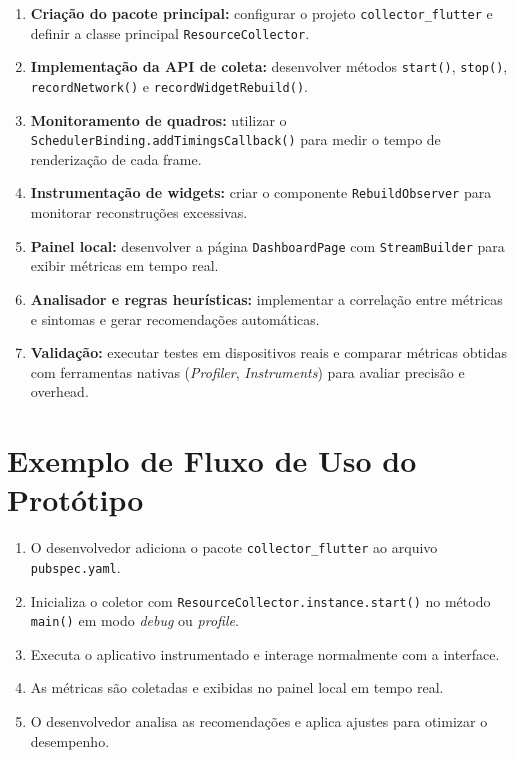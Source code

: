 \documentclass[12pt,a4paper,oneside]{abntex2}
\begin{document}
\begin{enumerate}
  \item \textbf{Criação do pacote principal:} configurar o projeto \texttt{collector\_flutter} e definir a classe principal \texttt{ResourceCollector}.
  \item \textbf{Implementação da API de coleta:} desenvolver métodos \texttt{start()}, \texttt{stop()}, \texttt{recordNetwork()} e \texttt{recordWidgetRebuild()}.
  \item \textbf{Monitoramento de quadros:} utilizar o \texttt{SchedulerBinding.addTimingsCallback()} para medir o tempo de renderização de cada frame.
  \item \textbf{Instrumentação de widgets:} criar o componente \texttt{RebuildObserver} para monitorar reconstruções excessivas.
  \item \textbf{Painel local:} desenvolver a página \texttt{DashboardPage} com \texttt{StreamBuilder} para exibir métricas em tempo real.
  \item \textbf{Analisador e regras heurísticas:} implementar a correlação entre métricas e sintomas e gerar recomendações automáticas.
  \item \textbf{Validação:} executar testes em dispositivos reais e comparar métricas obtidas com ferramentas nativas (\textit{Profiler}, \textit{Instruments}) para avaliar precisão e overhead.
\end{enumerate}

\section{Exemplo de Fluxo de Uso do Protótipo}

\begin{enumerate}
  \item O desenvolvedor adiciona o pacote \texttt{collector\_flutter} ao arquivo \texttt{pubspec.yaml}.
  \item Inicializa o coletor com \texttt{ResourceCollector.instance.start()} no método \texttt{main()} em modo \textit{debug} ou \textit{profile}.
  \item Executa o aplicativo instrumentado e interage normalmente com a interface.
  \item As métricas são coletadas e exibidas no painel local em tempo real.
  \item O desenvolvedor analisa as recomendações e aplica ajustes para otimizar o desempenho.
\end{enumerate}
\end{document}
